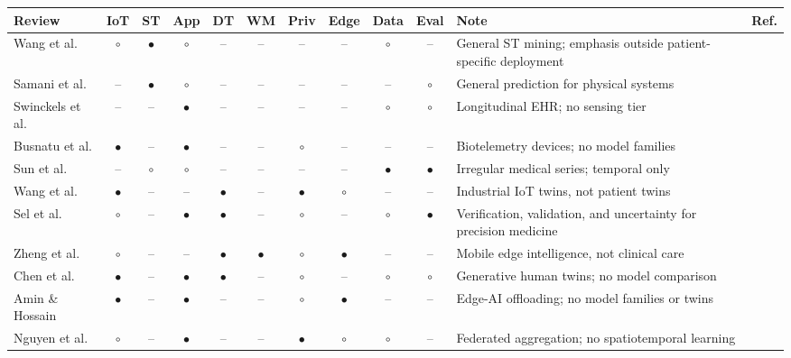 \documentclass[journal]{IEEEtran}
\begin{document}
\begin{table}[tp]
\footnotesize
\setlength{\tabcolsep}{2.5pt}
\renewcommand{\arraystretch}{1.12}
\begin{tabularx}{\textwidth}{|>{\raggedright\arraybackslash}p{2.15cm}|c|c|c|c|c|c|c|c|c|>{\raggedright\arraybackslash}X|>{\raggedright\arraybackslash}p{0.95cm}|}
\hline
Review & IoT & ST & App & DT & WM & Priv & Edge & Data & Eval & Note & Ref. \\
\hline
Wang et al. & $\circ$ & $\bullet$ & $\circ$ & -- & -- & -- & -- & $\circ$ & -- & General ST mining; emphasis outside patient-specific deployment & \cite{wang2022deep} \\
\hline
Samani et al. & -- & $\bullet$ & $\circ$ & -- & -- & -- & -- & -- & $\circ$ & General prediction for physical systems & \cite{samani2026stdl} \\
\hline
Swinckels et al. & -- & -- & $\bullet$ & -- & -- & -- & -- & $\circ$ & $\circ$ & Longitudinal EHR; no sensing tier & \cite{swinckels2024ehr} \\
\hline
Busnatu et al. & $\bullet$ & -- & $\bullet$ & -- & -- & $\circ$ & -- & -- & -- & Biotelemetry devices; no model families & \cite{Busnatu2022} \\
\hline
Sun et al. & -- & $\circ$ & $\circ$ & -- & -- & -- & -- & $\bullet$ & $\bullet$ & Irregular medical series; temporal only & \cite{sun2026irregularmedical} \\
\hline
Wang et al. & $\bullet$ & -- & -- & $\bullet$ & -- & $\bullet$ & $\circ$ & -- & -- & Industrial IoT twins, not patient twins & \cite{Wang2023Survey} \\
\hline
Sel et al. & $\circ$ & -- & $\bullet$ & $\bullet$ & -- & $\circ$ & -- & $\circ$ & $\bullet$ & Verification, validation, and uncertainty for precision medicine & \cite{Sel2025VVUQ} \\
\hline
Zheng et al. & $\circ$ & -- & -- & $\bullet$ & $\bullet$ & $\circ$ & $\bullet$ & -- & -- & Mobile edge intelligence, not clinical care & \cite{Zheng2026DTtoWM} \\
\hline
Chen et al. & $\bullet$ & -- & $\bullet$ & $\bullet$ & -- & $\circ$ & -- & $\circ$ & $\circ$ & Generative human twins; no model comparison & \cite{chen2024genaitwin} \\
\hline
Amin \& Hossain & $\bullet$ & -- & $\bullet$ & -- & -- & $\circ$ & $\bullet$ & -- & -- & Edge-AI offloading; no model families or twins & \cite{amin2021edgeintel} \\
\hline
Nguyen et al. & $\circ$ & -- & $\bullet$ & -- & -- & $\bullet$ & $\circ$ & $\circ$ & -- & Federated aggregation; no spatiotemporal learning & \cite{nguyen2022FLsmarthealthcare} \\

\end{tabularx}
\end{table}
\end{document}
